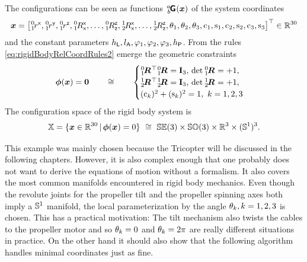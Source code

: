 \begin{Example}
The configurations can be seen as functions $\bodyHomoCoord{\BidxI}{\BidxII}(\sysCoord)$ of the system coordinates
\begin{align}
 \sysCoord = \big[
  \bodyPosx{0}{1}, \bodyPosy{0}{1}, \bodyPosz{0}{1},
  \bodyRotxx{0}{1}, \ldots, \bodyRotzz{0}{1},
  \bodyRotxx{1}{2}, \ldots, \bodyRotzz{1}{2},
  \PropTilt[1], \PropTilt[2], \PropTilt[3],
  \cPropAngle[1], \sPropAngle[1],
  \cPropAngle[2], \sPropAngle[2],
  \cPropAngle[3], \sPropAngle[3]
 \big]^\top \in \RealNum^{30}
\end{align}
and the constant parameters $\LoadHeight, \ArmRadius, \ArmAngle[1], \ArmAngle[2], \ArmAngle[3], \PropHeight$.
From the rules \eqref{eq:rigidBodyRelCoordRules2} emerge the geometric constraints
\begin{align}\label{eq:TricopterExampleConstraint}
 \geoConstraint(\sysCoord) = \tuple{0} 
\qquad \cong \qquad 
 \begin{cases}
  \bodyRot{0}{1}^\top \bodyRot{0}{1} = \idMat[3], \, \det\bodyRot{0}{1} = +1, \\
  \bodyRot{1}{2}^\top \bodyRot{1}{2} = \idMat[3], \, \det\bodyRot{1}{2} = +1, \\
  (\cPropAngle[k])^2 + (\sPropAngle[k])^2 = 1, \ k=1,2,3
 \end{cases}
\end{align}
The configuration space of the rigid body system is
\begin{align}
 \configSpace = \{ \sysCoord \in \RealNum^{30} \, | \, \geoConstraint(\sysCoord) = 0 \} \ \cong \ \SpecialEuclideanGroup(3) \times \SpecialOrthogonalGroup(3) \times \RealNum^3 \times (\Sphere^1)^3.
\end{align}

This example was mainly chosen because the Tricopter will be discussed in the following chapters.
However, it is also complex enough that one probably does not want to derive the equations of motion without a formalism.
It also covers the most common manifolds encountered in rigid body mechanics.
Even though the revolute joints for the propeller tilt and the propeller spinning axes both imply a $\Sphere^1$ manifold, the local parameterization by the angle $\aServo[k],k=1,2,3$ is chosen.
This has a practical motivation: The tilt mechanism also twists the cables to the propeller motor and so $\aServo[k] = 0$ and $\aServo[k] = 2\pi$ are really different situations in practice.
On the other hand it should also show that the following algorithm handles minimal coordinates just as fine.
\end{Example}

